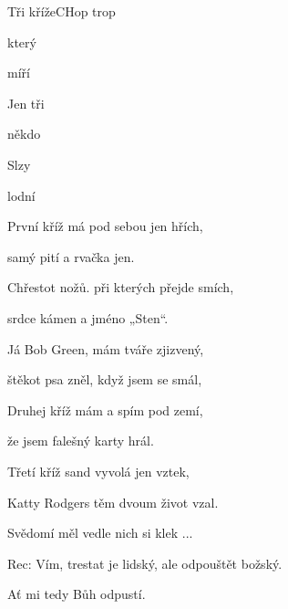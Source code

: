 \begin{song}{Tři kříže}{C}{Hop trop}

\begin{SBVerse}


který 


míří 

\end{SBVerse}

\begin{SBChorus}

Jen tři 

někdo 

Slzy 

lodní 

\end{SBChorus}

\begin{SBVerse}

První kříž má pod sebou jen hřích, 

samý pití a rvačka jen.

Chřestot nožů. při kterých přejde smích, 

srdce kámen a jméno „Sten“.

\end{SBVerse}

\begin{SBVerse}

Já Bob Green, mám tváře zjizvený, 

štěkot psa zněl, když jsem se smál,

Druhej kříž mám a spím pod zemí, 

že jsem falešný karty hrál.

\end{SBVerse}

\begin{SBVerse}

Třetí kříž sand vyvolá jen vztek, 

Katty Rodgers těm dvoum život vzal.

Svědomí měl vedle nich si klek ...

\end{SBVerse}

Rec: Vím, trestat je lidský, ale odpouštět božský. 

Ať mi tedy Bůh odpustí.
\end{song}

\pagebreak